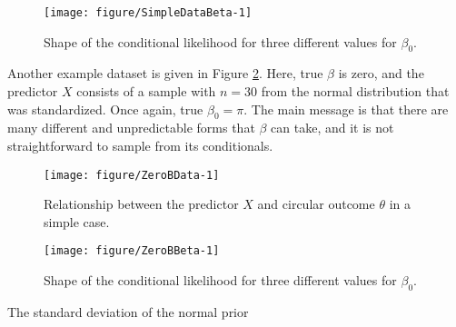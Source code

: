 \documentclass[12pt,a4paper]{article}\usepackage[]{graphicx}\usepackage[]{color}
\makeatletter
\def\maxwidth{ %
  \ifdim\Gin@nat@width>\linewidth
    \linewidth
  \else
    \Gin@nat@width
  \fi
}
\newenvironment{knitrout}{}{} %
\makeatother
\begin{document}
\begin{figure}
\label{SimpleDataBeta}
\begin{knitrout}
\color{fgcolor}

{\centering \texttt{[image: figure/SimpleDataBeta-1]} 

}



\end{knitrout}
\caption{Shape of the conditional likelihood for three different values for $\beta_0$.}
\label{SimpleDataBeta}
\end{figure}

Another example dataset is given in Figure \ref{ZeroBData}. Here, true $\beta$ is zero, and the predictor $X$ consists of a sample with $n=30$ from the normal distribution that was standardized. Once again, true $\beta_0 = \pi$. The main message is that there are many different and unpredictable forms that $\beta$ can take, and it is not straightforward to sample from its conditionals.

\begin{figure}
\label{ZeroBData}
\begin{knitrout}
\color{fgcolor}

{\centering \texttt{[image: figure/ZeroBData-1]} 

}



\end{knitrout}
\caption{Relationship between the predictor $X$ and circular outcome $\theta$ in a simple case.}
\label{ZeroBData}
\end{figure}



\begin{figure}
\label{ZeroBBeta}
\begin{knitrout}
\color{fgcolor}

{\centering \texttt{[image: figure/ZeroBBeta-1]} 

}



\end{knitrout}
\caption{Shape of the conditional likelihood for three different values for $\beta_0$.}
\label{ZeroBBeta}
\end{figure}

The standard deviation of the normal prior
\end{document}
